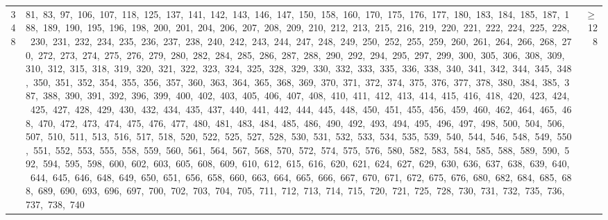 \begin{longtable}{c|p{}|r}
348 & 81,\ 83,\ 97,\ 106,\ 107,\ 118,\ 125,\ 137,\ 141,\ 142,\ 143,\ 146,\ 147,\ 150,\ 158,\ 160,\ 170,\ 175,\ 176,\ 177,\ 180,\ 183,\ 184,\ 185,\ 187,\ 188,\ 189,\ 190,\ 195,\ 196,\ 198,\ 200,\ 201,\ 204,\ 206,\ 207,\ 208,\ 209,\ 210,\ 212,\ 213,\ 215,\ 216,\ 219,\ 220,\ 221,\ 222,\ 224,\ 225,\ 228,\ 230,\ 231,\ 232,\ 234,\ 235,\ 236,\ 237,\ 238,\ 240,\ 242,\ 243,\ 244,\ 247,\ 248,\ 249,\ 250,\ 252,\ 255,\ 259,\ 260,\ 261,\ 264,\ 266,\ 268,\ 270,\ 272,\ 273,\ 274,\ 275,\ 276,\ 279,\ 280,\ 282,\ 284,\ 285,\ 286,\ 287,\ 288,\ 290,\ 292,\ 294,\ 295,\ 297,\ 299,\ 300,\ 305,\ 306,\ 308,\ 309,\ 310,\ 312,\ 315,\ 318,\ 319,\ 320,\ 321,\ 322,\ 323,\ 324,\ 325,\ 328,\ 329,\ 330,\ 332,\ 333,\ 335,\ 336,\ 338,\ 340,\ 341,\ 342,\ 344,\ 345,\ 348,\ 350,\ 351,\ 352,\ 354,\ 355,\ 356,\ 357,\ 360,\ 363,\ 364,\ 365,\ 368,\ 369,\ 370,\ 371,\ 372,\ 374,\ 375,\ 376,\ 377,\ 378,\ 380,\ 384,\ 385,\ 387,\ 388,\ 390,\ 391,\ 392,\ 396,\ 399,\ 400,\ 402,\ 403,\ 405,\ 406,\ 407,\ 408,\ 410,\ 411,\ 412,\ 413,\ 414,\ 415,\ 416,\ 418,\ 420,\ 423,\ 424,\ 425,\ 427,\ 428,\ 429,\ 430,\ 432,\ 434,\ 435,\ 437,\ 440,\ 441,\ 442,\ 444,\ 445,\ 448,\ 450,\ 451,\ 455,\ 456,\ 459,\ 460,\ 462,\ 464,\ 465,\ 468,\ 470,\ 472,\ 473,\ 474,\ 475,\ 476,\ 477,\ 480,\ 481,\ 483,\ 484,\ 485,\ 486,\ 490,\ 492,\ 493,\ 494,\ 495,\ 496,\ 497,\ 498,\ 500,\ 504,\ 506,\ 507,\ 510,\ 511,\ 513,\ 516,\ 517,\ 518,\ 520,\ 522,\ 525,\ 527,\ 528,\ 530,\ 531,\ 532,\ 533,\ 534,\ 535,\ 539,\ 540,\ 544,\ 546,\ 548,\ 549,\ 550,\ 551,\ 552,\ 553,\ 555,\ 558,\ 559,\ 560,\ 561,\ 564,\ 567,\ 568,\ 570,\ 572,\ 574,\ 575,\ 576,\ 580,\ 582,\ 583,\ 584,\ 585,\ 588,\ 589,\ 590,\ 592,\ 594,\ 595,\ 598,\ 600,\ 602,\ 603,\ 605,\ 608,\ 609,\ 610,\ 612,\ 615,\ 616,\ 620,\ 621,\ 624,\ 627,\ 629,\ 630,\ 636,\ 637,\ 638,\ 639,\ 640,\ 644,\ 645,\ 646,\ 648,\ 649,\ 650,\ 651,\ 656,\ 658,\ 660,\ 663,\ 664,\ 665,\ 666,\ 667,\ 670,\ 671,\ 672,\ 675,\ 676,\ 680,\ 682,\ 684,\ 685,\ 688,\ 689,\ 690,\ 693,\ 696,\ 697,\ 700,\ 702,\ 703,\ 704,\ 705,\ 711,\ 712,\ 713,\ 714,\ 715,\ 720,\ 721,\ 725,\ 728,\ 730,\ 731,\ 732,\ 735,\ 736,\ 737,\ 738,\ 740 & $\ge$ 128 \\

\end{longtable}
